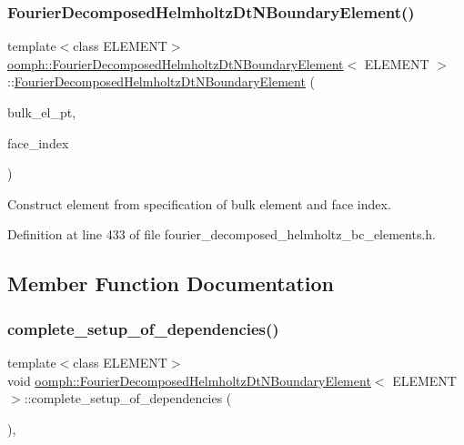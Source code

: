 \subsubsection{\texorpdfstring{Fourier\+Decomposed\+Helmholtz\+Dt\+N\+Boundary\+Element()}{FourierDecomposedHelmholtzDtNBoundaryElement()}}
{\footnotesize\ttfamily template$<$class E\+L\+E\+M\+E\+NT$>$ \\
\hyperlink{classoomph_1_1FourierDecomposedHelmholtzDtNBoundaryElement}{oomph\+::\+Fourier\+Decomposed\+Helmholtz\+Dt\+N\+Boundary\+Element}$<$ E\+L\+E\+M\+E\+NT $>$\+::\hyperlink{classoomph_1_1FourierDecomposedHelmholtzDtNBoundaryElement}{Fourier\+Decomposed\+Helmholtz\+Dt\+N\+Boundary\+Element} (\begin{DoxyParamCaption}\item[{\hyperlink{classoomph_1_1FiniteElement}{Finite\+Element} $\ast$const \&}]{bulk\+\_\+el\+\_\+pt,  }\item[{const int \&}]{face\+\_\+index }\end{DoxyParamCaption})\hspace{0.3cm}{\ttfamily [inline]}}



Construct element from specification of bulk element and face index. 



Definition at line 433 of file fourier\+\_\+decomposed\+\_\+helmholtz\+\_\+bc\+\_\+elements.\+h.



\subsection{Member Function Documentation}
\mbox{\label{classoomph_1_1FourierDecomposedHelmholtzDtNBoundaryElement_a7d8941de400e6f9497ae80ce24fee6cd}} 
\subsubsection{\texorpdfstring{complete\+\_\+setup\+\_\+of\+\_\+dependencies()}{complete\_setup\_of\_dependencies()}}
{\footnotesize\ttfamily template$<$class E\+L\+E\+M\+E\+NT$>$ \\
void \hyperlink{classoomph_1_1FourierDecomposedHelmholtzDtNBoundaryElement}{oomph\+::\+Fourier\+Decomposed\+Helmholtz\+Dt\+N\+Boundary\+Element}$<$ E\+L\+E\+M\+E\+NT $>$\+::complete\+\_\+setup\+\_\+of\+\_\+dependencies (\begin{DoxyParamCaption}{ }\end{DoxyParamCaption})\hspace{0.3cm}{\ttfamily [inline]}, {\ttfamily [virtual]}}



